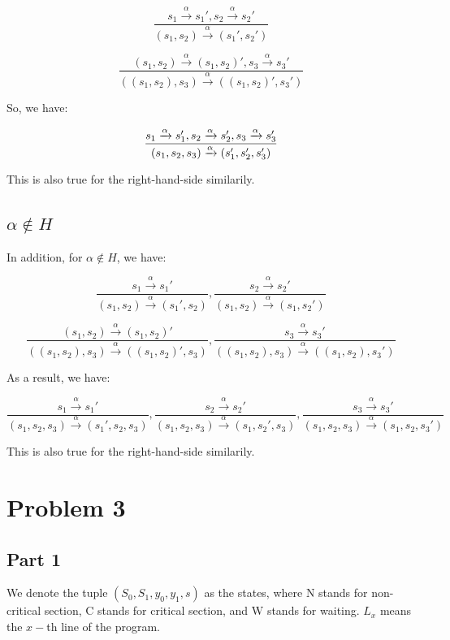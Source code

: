 \newcommand{\doubleTrans}[4] {
    \frac {
        #1 \xrightarrow{\alpha} #2, #3 \xrightarrow{\alpha} #4
    } {
        (#1, #3) \xrightarrow{\alpha} (#2, #4)
    }
}

\newcommand{\singleTransL}[3] {
    \frac {
        #1 \xrightarrow{\alpha} #2
    } {
        (#1, #3) \xrightarrow{\alpha} (#2, #3)
    }
}

\newcommand{\singleTransR}[3] {
    \frac {
        #1 \xrightarrow{\alpha} #2
    } {
        (#3, #1) \xrightarrow{\alpha} (#3, #2)
    }
}


\newcommand{\singleTriple}[8] {
    \frac {
        #1 \xrightarrow{\alpha} #2
    } {
        (#3, #5, #7) \xrightarrow{\alpha} (#4, #6, #8)
    }
}

$$
\doubleTrans{s_1}{s_1'}{s_2}{s_2'}
$$

$$
\doubleTrans{(s_1, s_2)}{(s_1, s_2)'}{s_3}{s_3'}
$$

So, we have:

$$
\frac { s_1 \xrightarrow{\alpha} s_1', s_2 \xrightarrow{\alpha} s_2', s_3 \xrightarrow{\alpha} s_3' } { (s_1, s_2, s_3) \xrightarrow{\alpha} (s_1', s_2', s_3') }
$$

This is also true for the right-hand-side similarily.

\subsection{$\alpha \notin H$}

In addition, for $\alpha \notin H$, we have:

$$
\singleTransL{s_1}{s_1'}{s_2}, \singleTransR{s_2}{s_2'}{s_1}
$$

$$
\singleTransL{(s_1, s_2)}{(s_1, s_2)'}{s_3}, \singleTransR{s_3}{s_3'}{(s_1, s_2)}
$$

As a result, we have:

$$
\singleTriple{s_1}{s_1'}{s_1}{s_1'}{s_2}{s_2}{s_3}{s_3},
\singleTriple{s_2}{s_2'}{s_1}{s_1}{s_2}{s_2'}{s_3}{s_3},
\singleTriple{s_3}{s_3'}{s_1}{s_1}{s_2}{s_2}{s_3}{s_3'}
$$

This is also true for the right-hand-side similarily.

\section{Problem 3}

\subsection{Part 1}

We denote the tuple $(S_0, S_1, y_0, y_1, s)$ as the states, where $\text{N}$ stands for non-critical section,
$\text{C}$ stands for critical section, and $\text{W}$ stands for waiting. $L_x$ means the $x-$th line of the program.

